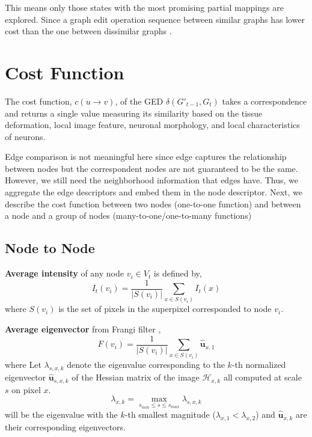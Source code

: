 \documentclass[10pt,letterpaper]{article}
\begin{document}
This means only those states with the most promising partial mappings are explored. Since a graph edit operation sequence between similar graphs has lower cost than the one between dissimilar graphs \cite{neuhaus2006}.



\section{Cost Function}
The cost function, $c(u \rightarrow v)$, of the GED $\delta (G'_{t-1}, G_t)$ takes a correspondence and returns a single value measuring its similarity based on the tissue deformation, local image feature, neuronal morphology, and local characteristics of neurons.

Edge comparison is not meaningful here since edge captures the relationship between nodes but the correspondent nodes are not guaranteed to be the same. However, we still need the neighborhood information that edges have. Thus, we aggregate the edge descriptors and embed them in the node descriptor. Next, we describe the cost function between two nodes (one-to-one function) and between a node and a group of nodes (many-to-one/one-to-many functions)

\subsection{Node to Node}
\textbf{Average intensity} of any node $v_i \in V_t$ is defined by,
\begin{equation}
I_t(v_i) = \frac{1}{|S(v_i)|}\sum_{x \in S(v_i)} I_t(x)
\end{equation} 
where $S(v_i)$ is the set of pixels in the superpixel corresponded to node $v_i$.

\textbf{Average eigenvector} from Frangi filter \cite{frangi1998},
\begin{equation}
F(v_i) = \frac{1}{|S(v_i)|}\sum_{x \in S(v_i)} \hat{\textbf{u}}_{x,1}
\end{equation}
where Let $\lambda_{s,x,k}$ denote the eigenvalue corresponding to the $k$-th normalized eigenvector $\hat{\textbf{u}}_{s,x,k}$
of the Hessian matrix of the image $\mathcal{H}_{x,k}$ all computed at scale $s$ on pixel $x$. 
\begin{equation}
\lambda_{x,k} = \max_{s_{min} \le s \le s_{max}} \lambda_{s,x,k}
\end{equation}
will be the eigenvalue with the $k$-th smallest magnitude ($\lambda_{x,1} < \lambda_{x,2}$) and $\hat{\textbf{u}}_{x,k}$ are their corresponding eigenvectors.
\end{document}

